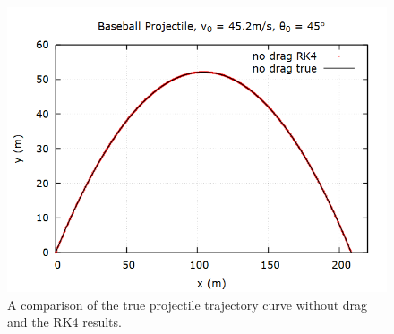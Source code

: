 \documentclass[aps,prl,twocolumn,superscriptaddress]{revtex4-1}
\begin{document}
\begin{figure}[htbp]
  	\begin{center}
 		\includegraphics[scale=0.3]{projcompare.png}
  		\caption{A comparison of the true projectile trajectory curve without drag and the RK4 results.}
  		\label{gr:projfit}
 	\end{center}
\end{figure}
\end{document}

